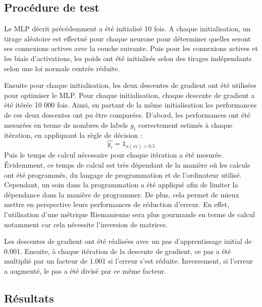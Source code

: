 \documentclass{article}
\theoremstyle{definition}
\begin{document}
\subsection{Procédure de test}

Le MLP décrit précédemment a été initialisé 10 fois. A chaque initialisation, un tirage aléatoire est effectué pour chaque neurone pour déterminer quelles seront ses connexions actives avec la couche suivante. Puis pour les connexions actives et les biais d'activations, les poids ont été initialisés selon des tirages indépendants selon une loi normale centrée réduite.

Ensuite pour chaque initialisation, les deux descentes de gradient ont été utilisées pour optimiser le MLP. Pour chaque initialisation, chaque descente de gradient a été itérée 10 000 fois. Ainsi, en partant de la même initialisation les performances de ces deux descentes ont pu être comparées.  
 D'abord, les performances ont été mesurées en terme de nombres de labels $y_i$ correctement estimés à chaque itération, en appliquant la règle de décision : 
$$\hat{y_i}=\mathds{1}_{a(xi)>0.5}$$
Puis le temps de calcul nécessaire pour chaque itération a été mesurée. Évidemment, ce temps de calcul est très dépendant de la manière où les calculs ont été programmés, du langage de programmation et de l'ordinateur utilisé. Cependant, un soin dans la programmation a été appliqué afin de limiter la dépendance dans la manière de programmer. De plus, cela permet de mieux mettre en perspective leurs performances de réduction d'erreur. En effet, l'utilisation d'une métrique Riemanienne sera plus gourmande en terme de calcul notamment car cela nécessite l'inversion de matrices.

Les descentes de gradient ont été réalisées avec un pas d'apprentissage initial de 0.001. Ensuite, à chaque itération de la descente de gradient, ce pas a été multiplié par un facteur de 1.001 si l'erreur s'est réduite. Inversement, si l'erreur a augmenté, le pas a été divisé par ce même facteur.

\subsection{Résultats}
\end{document}
